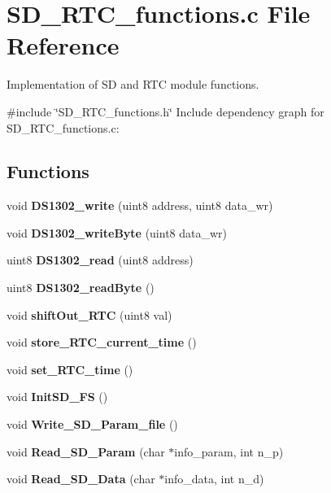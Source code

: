 \section{S\+D\+\_\+\+R\+T\+C\+\_\+functions.\+c File Reference}
\label{_s_d___r_t_c__functions_8c}


Implementation of SD and R\+TC module functions.  


{\ttfamily \#include \char`\"{}S\+D\+\_\+\+R\+T\+C\+\_\+functions.\+h\char`\"{}}\newline
Include dependency graph for S\+D\+\_\+\+R\+T\+C\+\_\+functions.\+c\+:
\subsection*{Functions}
\begin{DoxyCompactItemize}
\item 
\mbox{\label{_s_d___r_t_c__functions_8c_ae916e48139e2369b4295bc32b754cb09}} 
void {\bfseries D\+S1302\+\_\+write} (uint8 address, uint8 data\+\_\+wr)
\item 
\mbox{\label{_s_d___r_t_c__functions_8c_abf7dafb7cb2decd885c06cfd0d508a86}} 
void {\bfseries D\+S1302\+\_\+write\+Byte} (uint8 data\+\_\+wr)
\item 
\mbox{\label{_s_d___r_t_c__functions_8c_a648ecf3d4f3a92e6390945b156d5c98a}} 
uint8 {\bfseries D\+S1302\+\_\+read} (uint8 address)
\item 
\mbox{\label{_s_d___r_t_c__functions_8c_a961280caa20d802239a974419c19437e}} 
uint8 {\bfseries D\+S1302\+\_\+read\+Byte} ()
\item 
\mbox{\label{_s_d___r_t_c__functions_8c_a1f5533e91998b92926173f479322c7d9}} 
void {\bfseries shift\+Out\+\_\+\+R\+TC} (uint8 val)
\item 
\mbox{\label{_s_d___r_t_c__functions_8c_a262170705e582875a383a9f5c9b137a7}} 
void {\bfseries store\+\_\+\+R\+T\+C\+\_\+current\+\_\+time} ()
\item 
\mbox{\label{_s_d___r_t_c__functions_8c_ad0181162f59bf423c6d1dc1556afb6fc}} 
void {\bfseries set\+\_\+\+R\+T\+C\+\_\+time} ()
\item 
\mbox{\label{_s_d___r_t_c__functions_8c_a56466454f41dc875787a75f0d78b5602}} 
void {\bfseries Init\+S\+D\+\_\+\+FS} ()
\item 
\mbox{\label{_s_d___r_t_c__functions_8c_a5072914b0c92c6825bb196ba84b332c4}} 
void {\bfseries Write\+\_\+\+S\+D\+\_\+\+Param\+\_\+file} ()
\item 
\mbox{\label{_s_d___r_t_c__functions_8c_a9d056c3da2f8cd5c55be410e1959a485}} 
void {\bfseries Read\+\_\+\+S\+D\+\_\+\+Param} (char $\ast$info\+\_\+param, int n\+\_\+p)
\item 
\mbox{\label{_s_d___r_t_c__functions_8c_a0fbed516c0eda1c199a7641ca5c88692}} 
void {\bfseries Read\+\_\+\+S\+D\+\_\+\+Data} (char $\ast$info\+\_\+data, int n\+\_\+d)
\end{DoxyCompactItemize}


